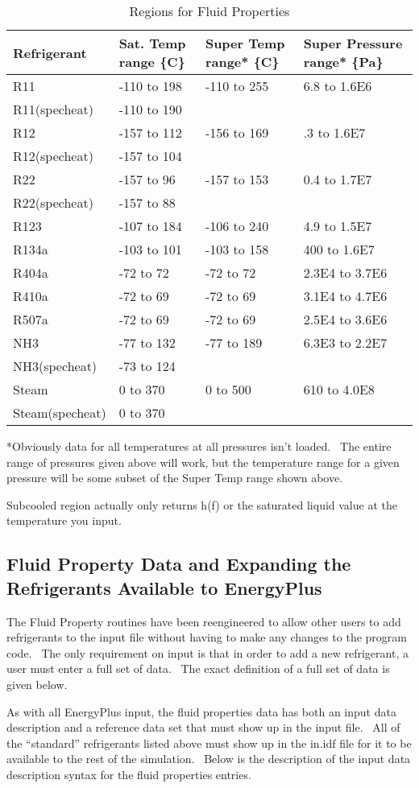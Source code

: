 \begin{longtable}[c]{p{1.5in}p{1.5in}p{1.5in}p{1.5in}}
\caption{  Regions for Fluid Properties \protect \label{table:regions-for-fluid-properties}}\\
\toprule 
Refrigerant & Sat. Temp range \{C\} & Super Temp range* \{C\} & Super Pressure range* \{Pa\} \tabularnewline \midrule
\endhead
R11 & -110 to 198 & -110 to 255 & 6.8 to 1.6E6 \tabularnewline
R11(specheat) & -110 to 190 & ~ & ~ \tabularnewline
R12 & -157 to 112 & -156 to 169 & .3 to 1.6E7 \tabularnewline
R12(specheat) & -157 to 104 & ~ & ~ \tabularnewline
R22 & -157 to 96 & -157 to 153 & 0.4 to 1.7E7 \tabularnewline
R22(specheat) & -157 to 88 & ~ & ~ \tabularnewline
R123 & -107 to 184 & -106 to 240 & 4.9 to 1.5E7 \tabularnewline
R134a & -103 to 101 & -103 to 158 & 400 to 1.6E7 \tabularnewline
R404a & -72 to 72 & -72 to 72 & 2.3E4 to 3.7E6 \tabularnewline
R410a & -72 to 69 & -72 to 69 & 3.1E4 to 4.7E6 \tabularnewline
R507a & -72 to 69 & -72 to 69 & 2.5E4 to 3.6E6 \tabularnewline
NH3 & -77 to 132 & -77 to 189 & 6.3E3 to 2.2E7 \tabularnewline
NH3(specheat) & -73 to 124 & ~ & ~ \tabularnewline
Steam & 0 to 370 & 0 to 500 & 610 to 4.0E8 \tabularnewline
Steam(specheat) & 0 to 370 & ~ & ~ \tabularnewline
\bottomrule
\end{longtable}

*Obviously data for all temperatures at all pressures isn't loaded.~ The entire range of pressures given above will work, but the temperature range for a given pressure will be some subset of the Super Temp range shown above.

Subcooled region actually only returns h(f) or the saturated liquid value at the temperature you input.

\subsection{Fluid Property Data and Expanding the Refrigerants Available to EnergyPlus}\label{fluid-property-data-and-expanding-the-refrigerants-available-to-energyplus}

The Fluid Property routines have been reengineered to allow other users to add refrigerants to the input file without having to make any changes to the program code.~ The only requirement on input is that in order to add a new refrigerant, a user must enter a full set of data.~ The exact definition of a full set of data is given below.

As with all EnergyPlus input, the fluid properties data has both an input data description and a reference data set that must show up in the input file.~ All of the ``standard'' refrigerants listed above must show up in the in.idf file for it to be available to the rest of the simulation.~ Below is the description of the input data description syntax for the fluid properties entries.

